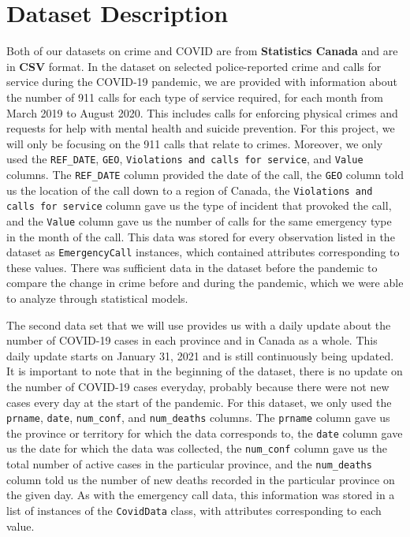\documentclass[fontsize=11pt]{article}
\begin{document}
\section{Dataset Description}
Both of our datasets on crime and COVID are from \textbf{Statistics Canada} and are in \textbf{CSV} format. In the dataset on selected police-reported crime and calls for service during the COVID-19 pandemic\cite{crime}, we are provided with information about the number of 911 calls for each type of service required, for each month from March 2019 to August 2020. This includes calls for enforcing physical crimes and requests for help with mental health and suicide prevention. For this project, we will only be focusing on the 911 calls that relate to  crimes. Moreover, we only used the \verb+REF_DATE+, \verb+GEO+, \verb+Violations and calls for service+, and \verb+Value+ columns. The \verb+REF_DATE+ column provided the date of the call, the \verb+GEO+ column told us the location of the call down to a region of Canada, the \verb+Violations and calls for service+ column gave us the type of incident that provoked the call, and the \verb+Value+ column gave us the number of calls for the same emergency type in the month of the call. This data was stored for every observation listed in the dataset as \verb+EmergencyCall+ instances, which contained attributes corresponding to these values. There was sufficient data in the dataset before the pandemic to compare the change in crime before and during the pandemic, which we were able to analyze through statistical models.

The second data set\cite{covid} that we will use provides us with a daily update about the number of COVID-19 cases in each province and in Canada as a whole. This daily update starts on January 31, 2021 and is still continuously being updated. It is important to note that in the beginning of the dataset, there is no update on the number of COVID-19 cases everyday, probably because there were not new cases every day at the start of the pandemic. For this dataset, we only used the \verb+prname+, \verb+date+, \verb+num_conf+, and \verb+num_deaths+ columns. The \verb+prname+ column gave us the province or territory for which the data corresponds to, the \verb+date+ column gave us the date for which the data was collected, the \verb+num_conf+ column gave us the total number of active cases in the particular province, and the \verb+num_deaths+ column told us the number of new deaths recorded in the particular province on the given day. As with the emergency call data, this information was stored in a list of instances of the \verb+CovidData+ class, with attributes corresponding to each value.
\end{document}
